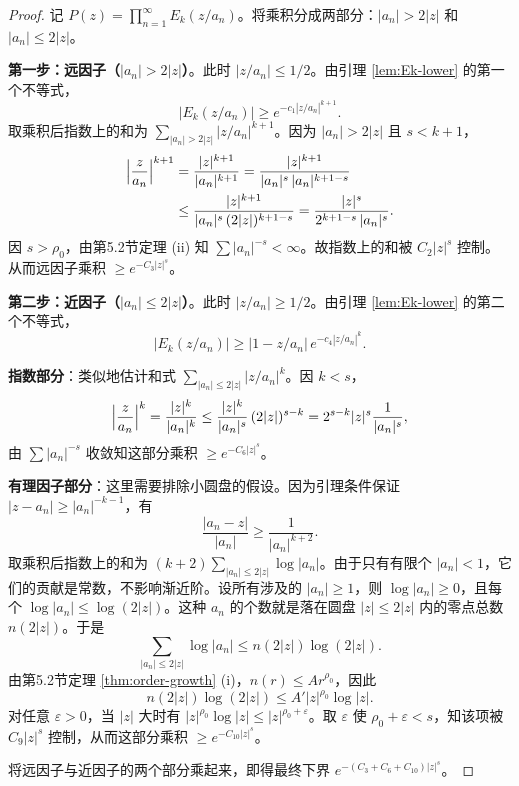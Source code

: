 \documentclass[UTF8]{ctexart}
\numberwithin{equation}{section}
\begin{document}
\begin{proof}
记 \(P(z) = \prod_{n=1}^\infty E_k(z/a_n)\)。将乘积分成两部分：\(|a_n| > 2|z|\) 和 \(|a_n| \le 2|z|\)。

\textbf{第一步：远因子（\(|a_n| > 2|z|\)）}。此时 \(|z/a_n| \le 1/2\)。由引理 \ref{lem:Ek-lower} 的第一个不等式，
\[
|E_k(z/a_n)| \ge e^{-c_1 |z/a_n|^{k+1}}.
\]
取乘积后指数上的和为 \(\sum_{|a_n| > 2|z|} |z/a_n|^{k+1}\)。因为 \(|a_n| > 2|z|\) 且 \(s < k+1\)，
\begin{align}
\Bigl| \frac{z}{a_n} \Bigr|^{k+1}
&= \frac{|z|^{k+1}}{|a_n|^{k+1}}
= \frac{|z|^{k+1}}{|a_n|^s \, |a_n|^{k+1-s}} \nonumber\\
&\le \frac{|z|^{k+1}}{|a_n|^s \, (2|z|)^{k+1-s}}
= \frac{|z|^s}{2^{k+1-s} \, |a_n|^s}.
\end{align}
因 \(s > \rho_0\)，由第5.2节定理 (ii) 知 \(\sum |a_n|^{-s} < \infty\)。故指数上的和被 \(C_2 |z|^s\) 控制。从而远因子乘积 \(\ge e^{-C_3 |z|^s}\)。

\textbf{第二步：近因子（\(|a_n| \le 2|z|\)）}。此时 \(|z/a_n| \ge 1/2\)。由引理 \ref{lem:Ek-lower} 的第二个不等式，
\[
|E_k(z/a_n)| \ge |1 - z/a_n| \, e^{-c_4 |z/a_n|^k}.
\]

\textbf{指数部分}：类似地估计和式 \(\sum_{|a_n| \le 2|z|} |z/a_n|^k\)。因 \(k < s\)，
\[
\Bigl| \frac{z}{a_n} \Bigr|^k = \frac{|z|^k}{|a_n|^k}
\le \frac{|z|^k}{|a_n|^s} \, (2|z|)^{s-k}
= 2^{s-k} |z|^s \frac{1}{|a_n|^s},
\]
由 \(\sum |a_n|^{-s}\) 收敛知这部分乘积 \(\ge e^{-C_6 |z|^s}\)。

\textbf{有理因子部分}：这里需要排除小圆盘的假设。因为引理条件保证 \(|z - a_n| \ge |a_n|^{-k-1}\)，有
\[
\frac{|a_n - z|}{|a_n|} \ge \frac{1}{|a_n|^{k+2}}.
\]
取乘积后指数上的和为 \((k+2) \sum_{|a_n| \le 2|z|} \log |a_n|\)。由于只有有限个 \(|a_n| < 1\)，它们的贡献是常数，不影响渐近阶。设所有涉及的 \(|a_n| \ge 1\)，则 \(\log |a_n| \ge 0\)，且每个 \(\log |a_n| \le \log(2|z|)\)。这种 \(a_n\) 的个数就是落在圆盘 \(|z| \le 2|z|\) 内的零点总数 \(n(2|z|)\)。于是
\[
\sum_{|a_n| \le 2|z|} \log |a_n| \le n(2|z|) \log(2|z|).
\]
由第5.2节定理 \ref{thm:order-growth} (i)，\(n(r) \le A r^{\rho_0}\)，因此
\[
n(2|z|) \log(2|z|) \le A' |z|^{\rho_0} \log |z|.
\]
对任意 \(\varepsilon > 0\)，当 \(|z|\) 大时有 \(|z|^{\rho_0} \log |z| \le |z|^{\rho_0+\varepsilon}\)。取 \(\varepsilon\) 使 \(\rho_0+\varepsilon < s\)，知该项被 \(C_9 |z|^s\) 控制，从而这部分乘积 \(\ge e^{-C_{10} |z|^s}\)。

将远因子与近因子的两个部分乘起来，即得最终下界 \(e^{-(C_3+C_6+C_{10}) |z|^s}\)。
\end{proof}
\end{document}

